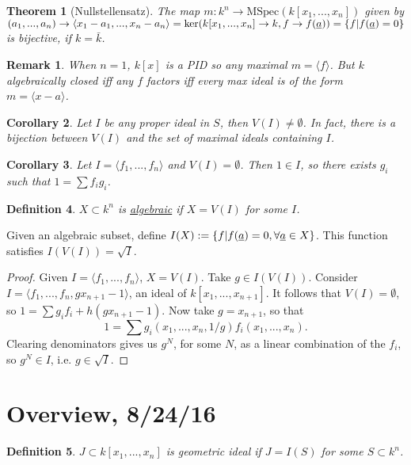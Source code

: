 \documentclass[letterpaper, 12pt]{article}
\newtheorem{rmk}{Remark}
\newtheorem{thm}{Theorem}[subsection]
\newtheorem{cor}[thm]{Corollary}
\newtheorem{definition}[thm]{Definition}
\newcommand{\polyring}[3]{#1[x_{#2}, ..., x_{#3}]}
\newcommand{\mspec}[1]{\mathrm{MSpec}(#1)}
\begin{document}
\begin{thm}[Nullstellensatz] The map $m : k^n \rightarrow \mspec {\polyring k
1 n}$ given by $(a_1, ..., a_n) \rightarrow \langle x_1 - a_1, ..., x_n - a_n
\rangle = \ker(\polyring k 1 n \rightarrow k, f \rightarrow f(\uline{a})) = \{
f | f(\uline{a}) = 0 \}$ is bijective, if $k = \bar{k}$.  \end{thm}

\begin{rmk} When $n = 1$, $k[x]$ is a PID so any maximal $m = \langle f
\rangle$. But $k$ algebraically closed iff any $f$ factors iff every max ideal
is of the form $m = \langle x - a \rangle$.  \end{rmk}

\begin{cor}   Let $I$ be any proper ideal in $S$, then $V(I) \neq \emptyset$.
In fact, there is a bijection between $V(I)$ and the set of maximal ideals
containing $I$. \end{cor}

\begin{cor}   Let $I = \langle f_1, ..., f_n \rangle$ and $V(I) = \emptyset$.
Then $1 \in I$, so there exists $g_i$ such that $1 = \sum f_i g_i$. \end{cor}

\begin{definition} $X \subset k^n$ is \uline{algebraic} if $X = V(I)$ for some
$I$. \end{definition}

Given an algebraic subset, define $I(X) := \{ f | f(\uline{a}) = 0, \forall
\uline{a} \in X \}$. This function satisfies $I(V(I)) = \sqrt{I}$.

\begin{proof}   Given $I = \langle f_1, ..., f_n \rangle$, $X = V(I)$. Take $g
\in I(V(I)).$ Consider $I = \langle f_1, ..., f_n, gx_{n + 1} - 1 \rangle$, an
ideal of $\polyring k 1 {n + 1}$. It follows that $V(I) = \emptyset$, so $1 =
\sum g_i f_i + h(g x_{n + 1} - 1)$. Now take $g = x_{n + 1}$, so that \[ 1 =
\sum g_i(x_1, ..., x_n, 1/g) f_i(x_1, ..., x_n).\] Clearing denominators gives
us $g^N$, for some $N$, as a linear combination of the $f_i$, so $g^N \in I$,
i.e. $g \in \sqrt{I}$. \end{proof}

\section{Overview, 8/24/16}

\begin{definition}   $J \subset \polyring k 1 n$ is geometric ideal if $J =
I(S)$ for some $S \subset k^n$. \end{definition}
\end{document}
